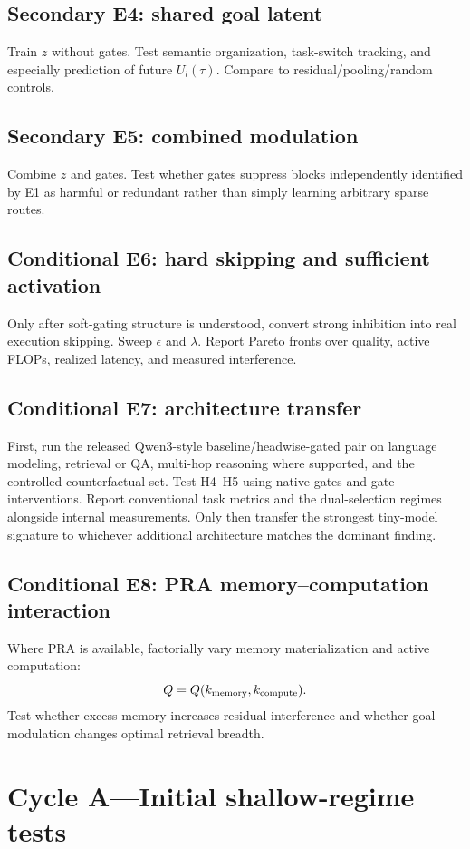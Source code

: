 \documentclass[10pt]{article}
\begin{document}
\subsection{Secondary E4: shared goal latent}
Train $z$ without gates. Test semantic organization, task-switch tracking, and especially prediction of future $U_l(\tau)$. Compare to residual/pooling/random controls.

\subsection{Secondary E5: combined modulation}
Combine $z$ and gates. Test whether gates suppress blocks independently identified by E1 as harmful or redundant rather than simply learning arbitrary sparse routes.

\subsection{Conditional E6: hard skipping and sufficient activation}
Only after soft-gating structure is understood, convert strong inhibition into real execution skipping. Sweep $\epsilon$ and $\lambda$. Report Pareto fronts over quality, active FLOPs, realized latency, and measured interference.

\subsection{Conditional E7: architecture transfer}
First, run the released Qwen3-style baseline/headwise-gated pair on language modeling, retrieval or QA, multi-hop reasoning where supported, and the controlled counterfactual set. Test H4--H5 using native gates and gate interventions. Report conventional task metrics and the dual-selection regimes alongside internal measurements. Only then transfer the strongest tiny-model signature to whichever additional architecture matches the dominant finding.

\subsection{Conditional E8: PRA memory--computation interaction}
Where PRA is available, factorially vary memory materialization and active computation:
\[
Q=Q(k_{\rm memory},k_{\rm compute}).
\]
Test whether excess memory increases residual interference and whether goal modulation changes optimal retrieval breadth.

\section{Cycle A---Initial shallow-regime tests}
\end{document}
